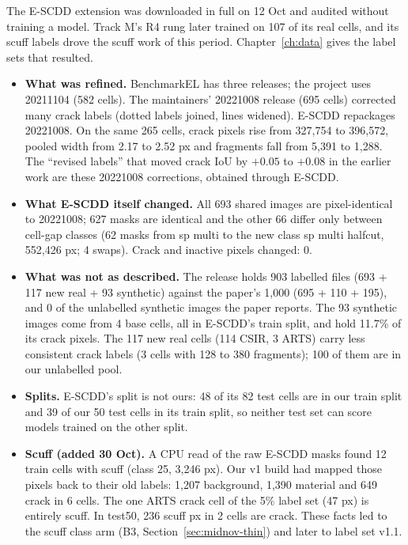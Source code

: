 The E-SCDD extension \citep{hanifi2025escdd} was downloaded in full on 12 Oct and audited without training a model. Track M's R4 rung later trained on 107 of its
real cells, and its scuff labels drove the scuff work of this period. Chapter~\ref{ch:data} gives the label sets that resulted.
\begin{itemize}
  \item \textbf{What was refined.} BenchmarkEL has three releases; the project uses 20211104 (582 cells). The maintainers'
    20221008 release (695 cells) corrected many crack labels (dotted labels joined, lines widened). E-SCDD repackages 20221008. On
    the same 265 cells, crack pixels rise from 327,754 to 396,572, pooled width from 2.17 to 2.52 px and fragments fall from 5,391
    to 1,288. The ``revised labels'' that moved crack IoU by $+0.05$ to $+0.08$ in the earlier work are these 20221008
    corrections, obtained through E-SCDD.
  \item \textbf{What E-SCDD itself changed.} All 693 shared images are pixel-identical to 20221008; 627 masks are identical and the
    other 66 differ only between cell-gap classes (62 masks from sp multi to the new class sp multi halfcut, 552,426 px; 4 swaps).
    Crack and inactive pixels changed: 0.
  \item \textbf{What was not as described.} The release holds 903 labelled files (693 + 117 new real + 93 synthetic) against the
    paper's 1,000 (695 + 110 + 195), and 0 of the unlabelled synthetic images the paper reports. The 93 synthetic images come from
    4 base cells, all in E-SCDD's train split, and hold 11.7\% of its crack pixels. The 117 new real cells (114 CSIR, 3 ARTS) carry
    less consistent crack labels (3 cells with 128 to 380 fragments); 100 of them are in our unlabelled pool.
  \item \textbf{Splits.} E-SCDD's split is not ours: 48 of its 82 test cells are in our train split and 39 of our 50 test cells in
    its train split, so neither test set can score models trained on the other split.
  \item \textbf{Scuff (added 30 Oct).} A CPU read of the raw E-SCDD masks found 12 train cells with scuff (class 25, 3,246 px).
    Our v1 build had mapped those pixels back to their old labels: 1,207 background, 1,390 material and 649 crack in 6 cells. The
    one ARTS crack cell of the 5\% label set (47 px) is entirely scuff. In test50, 236 scuff px in 2 cells are crack. These facts
    led to the scuff class arm (B3, Section~\ref{sec:midnov-thin}) and later to label set v1.1.
\end{itemize}


